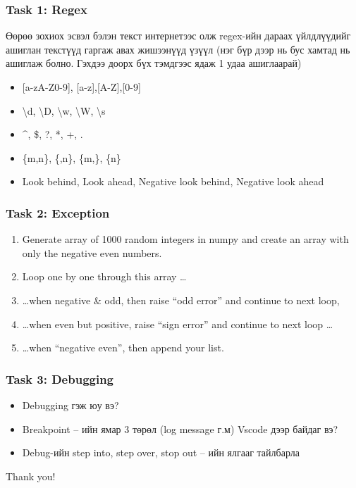 \documentclass{beamer}
\begin{document}
\begin{frame}
    \frametitle{Task 1: Regex}
    Өөрөө зохиох эсвэл бэлэн текст интернетээс олж regex-ийн 
    дараах үйлдлүүдийг ашиглан текстүүд гаргаж авах жишээнүүд үзүүл 
    (нэг бүр дээр нь бус хамтад нь ашиглаж болно. Гэхдээ доорх бүх тэмдгээс ядаж 1 удаа ашиглаарай)

    \begin{itemize}
        \item {[a-zA-Z0-9], [a-z],[A-Z],[0-9]}
        \item \textbackslash d, \textbackslash D, \textbackslash w, \textbackslash W, \textbackslash s
        \item \^{}, \$, ?, *, +, .
        \item \{m,n\}, \{,n\}, \{m,\}, \{n\}
        \item Look behind, Look ahead, Negative look behind, Negative look ahead
    \end{itemize}
\end{frame}

\begin{frame}
    \frametitle{Task 2: Exception}
    \begin{enumerate}
        \item Generate array of 1000 random integers in numpy and create an array with only the negative even numbers.
        \item Loop one by one through this array …
        \item \ldots when negative & odd, then raise “odd error” and continue to next loop, 
        \item \ldots when even but positive, raise “sign error” and continue to next loop \ldots
        \item \ldots when “negative even”, then append your list. 
    \end{enumerate}
\end{frame}

\begin{frame}
    \frametitle{Task 3: Debugging}
    \begin{itemize}
        \item Debugging гэж юу вэ?
        \item Breakpoint – ийн ямар 3 төрөл (log message г.м) Vscode дээр байдаг вэ?
        \item Debug-ийн step into, step over, stop out – ийн ялгааг тайлбарла 
    \end{itemize}
\end{frame}



\begin{frame}
\Huge{\centerline{Thank you!}}
\end{frame}

\end{document}

